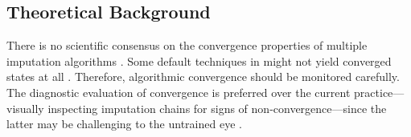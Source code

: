 \documentclass[article]{jss}
\begin{document}

% 
% 

\subsection{Theoretical Background} \label{sec:background}

There is no scientific consensus on the convergence properties of multiple imputation algorithms \citep{taka17}. Some default techniques in  might not yield converged states at all \citep{murr18}. Therefore, algorithmic convergence should be monitored carefully. The diagnostic evaluation of convergence is preferred over the current practice---visually inspecting imputation chains for signs of non-convergence---since the latter may be challenging to the untrained eye \citep[\S~6.5.2]{buur18}. %
\end{document}
